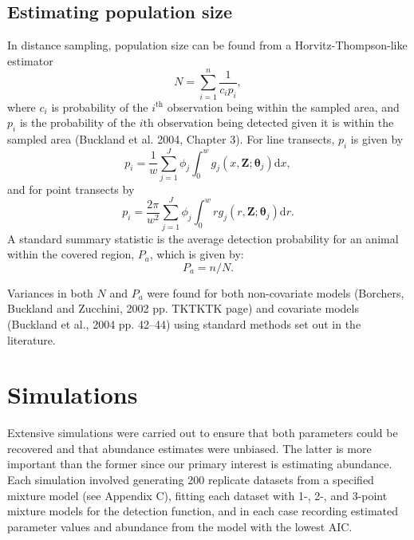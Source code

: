 \documentclass[useAMS,referee, usegraphicx]{biom}
\begin{document}
\subsection{Estimating population size}

In distance sampling, population size can be found from a Horvitz-Thompson-like estimator
\begin{equation*}
N = \sum_{i=1}^n \frac{1}{c_i p_i},
\end{equation*}
where $c_i$ is probability of the $i^\text{th}$ observation being within the sampled area, and $p_i$ is the probability of the $i\text{th}$ observation being detected given it is within the sampled area (Buckland et al. 2004, Chapter 3).  For line transects, $p_i$ is given by
\begin{equation*}
p_i = \frac{1}{w} \sum_{j=1}^J \phi_j \int_0^w  g_j(x,\mathbf{Z}; \bm{\theta}_j) \text{d}x,
\end{equation*}
and for point transects by
\begin{equation*}
p_i = \frac{2\pi}{w^2} \sum_{j=1}^J \phi_j \int_0^w  r g_j(r,\mathbf{Z}; \bm{\theta}_j) \text{d}r.
\end{equation*}
A standard summary statistic is the average detection probability for an animal within the covered region, $P_a$, which is given by:
\begin{equation*}
P_a = n/N.
\end{equation*}

Variances in both $N$ and $P_a$ were found for both non-covariate models (Borchers, Buckland and Zucchini, 2002 pp. TKTKTK page) and covariate models (Buckland et al., 2004 pp. 42--44) using standard methods set out in the literature.






\section{Simulations}

Extensive simulations were carried out to ensure that both parameters could be recovered and that abundance estimates were unbiased. The latter is more important than the former since our primary interest is estimating abundance. Each simulation involved generating 200 replicate datasets from a specified mixture model (see Appendix C), fitting each dataset with 1-, 2-, and 3-point mixture models for the detection function, and in each case recording estimated parameter values and abundance from the model with the lowest AIC.
\end{document}
